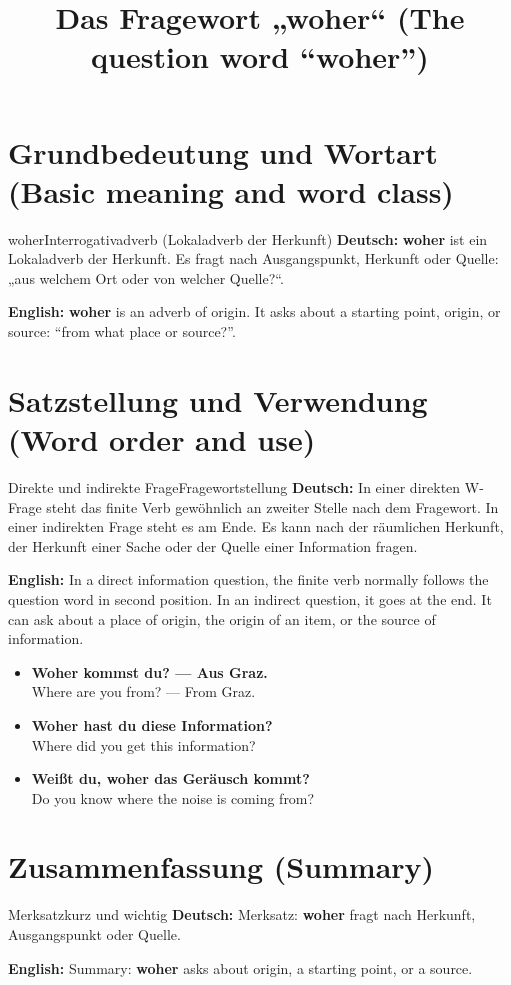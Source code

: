 \documentclass[a4paper,11pt]{article}
\title{Das Fragewort „woher“ (The question word “woher”)}
\date{}
\newcommand{\GermanText}[1]{\textbf{Deutsch: }#1\par}
\newcommand{\EnglishText}[1]{{\small\color{SoftGray}\textbf{English: }#1\par}}
\newcommand{\ExampleItem}[2]{\item \textbf{#1}\\{\small\color{SoftGray}#2}}
\begin{document}
\maketitle
\tableofcontents
\newpage
\section{Grundbedeutung und Wortart (Basic meaning and word class)}
\begin{grammarentry}{woher}{Interrogativadverb (Lokaladverb der Herkunft)}
\GermanText{\textbf{woher} ist ein Lokaladverb der Herkunft. Es fragt nach Ausgangspunkt, Herkunft oder Quelle: „aus welchem Ort oder von welcher Quelle?“.}
\EnglishText{\textbf{woher} is an adverb of origin. It asks about a starting point, origin, or source: “from what place or source?”.}

\end{grammarentry}
\section{Satzstellung und Verwendung (Word order and use)}
\begin{grammarentry}{Direkte und indirekte Frage}{Fragewortstellung}
\GermanText{In einer direkten W-Frage steht das finite Verb gewöhnlich an zweiter Stelle nach dem Fragewort. In einer indirekten Frage steht es am Ende. Es kann nach der räumlichen Herkunft, der Herkunft einer Sache oder der Quelle einer Information fragen.}
\EnglishText{In a direct information question, the finite verb normally follows the question word in second position. In an indirect question, it goes at the end. It can ask about a place of origin, the origin of an item, or the source of information.}
\end{grammarentry}
\begin{exbox}\begin{itemize}
\ExampleItem{Woher kommst du? — Aus Graz.}{Where are you from? — From Graz.}
\ExampleItem{Woher hast du diese Information?}{Where did you get this information?}
\ExampleItem{Weißt du, woher das Geräusch kommt?}{Do you know where the noise is coming from?}
\end{itemize}\end{exbox}
\section{Zusammenfassung (Summary)}
\begin{grammarentry}{Merksatz}{kurz und wichtig}
\GermanText{Merksatz: \textbf{woher} fragt nach Herkunft, Ausgangspunkt oder Quelle.}
\EnglishText{Summary: \textbf{woher} asks about origin, a starting point, or a source.}
\end{grammarentry}
\end{document}
